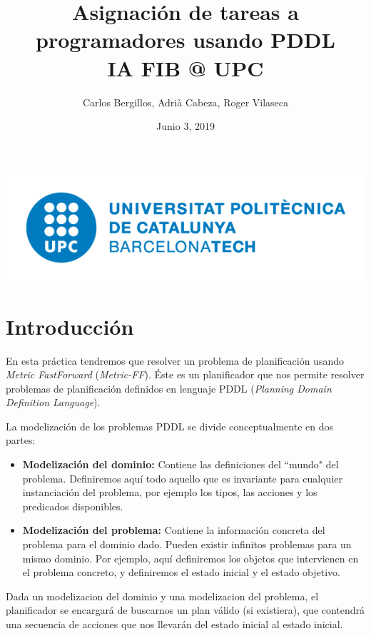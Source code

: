 \documentclass[11pt]{article}
\date{Junio 3, 2019}
\author{Carlos Bergillos, Adrià Cabeza, Roger Vilaseca}
\title{Asignación de tareas a programadores usando PDDL  \\ \large IA FIB @ UPC}
\begin{document}
\maketitle
\vspace*{\fill}
\begin{center}
\includegraphics[scale=0.35]{images/UPClogo.png}
\end{center}
\newpage

\tableofcontents

\newpage


\section{Introducción}
En esta práctica tendremos que resolver un problema de planificación usando \emph{Metric FastForward} (\emph{Metric-FF}). Éste es un planificador que nos permite resolver problemas de planificación definidos en lenguaje PDDL (\emph{Planning Domain Definition Language}).

La modelización de los problemas PDDL se divide conceptualmente en dos partes:
\begin{itemize}
	\item \textbf{Modelización del dominio:} Contiene las definiciones del ``mundo" del problema. Definiremos aquí todo aquello que es invariante para cualquier instanciación del problema, por ejemplo los tipos, las acciones y los predicados disponibles.
	\item \textbf{Modelización del problema:} Contiene la información concreta del problema para el dominio dado. Pueden existir infinitos problemas para un mismo dominio. Por ejemplo, aquí definiremos los objetos que intervienen en el problema concreto, y definiremos el estado inicial y el estado objetivo.
\end{itemize}

Dada un modelizacion del dominio y una modelizacion del problema, el planificador se encargará de buscarnos un plan válido (si existiera), que contendrá una secuencia de acciones que nos llevarán del estado inicial al estado inicial.
\end{document}
